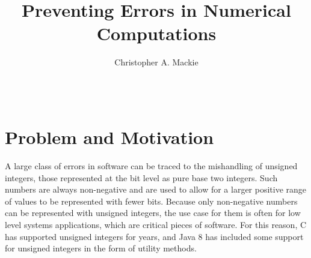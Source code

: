 \documentclass{sig-alternate-05-2015}
\begin{document}
\setlength{\pdfpageheight}{\paperheight}
\setlength{\pdfpagewidth}{\paperwidth}

\title{Preventing Errors in Numerical Computations}

\author{
Christopher A. Mackie\\
       \\
       \\
}

\maketitle


\section{Problem and Motivation}

A large class of errors in software can be traced to the mishandling of unsigned integers, those represented at the bit level as pure base two integers. Such numbers are always non-negative and are used to allow for a larger positive range of values to be represented with fewer bits. Because only non-negative numbers can be represented with unsigned integers, the use case for them is often for low level systems applications, which are critical pieces of software. For this reason, C has supported unsigned integers for years, and Java 8 has included some support for unsigned integers in the form of utility methods.
\end{document}
